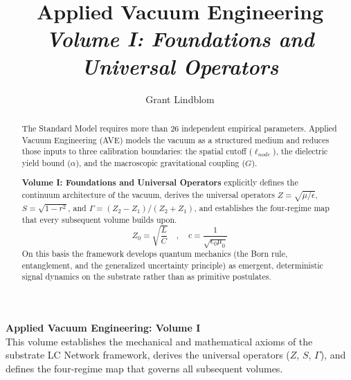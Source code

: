 \title{\textbf{Applied Vacuum Engineering} \\ \large \textit{Volume I: Foundations and Universal Operators}}
\author{Grant Lindblom}
\date{}

\maketitle

\vfill
\noindent\textbf{Applied Vacuum Engineering: Volume I} \\
This volume establishes the mechanical and mathematical axioms of the substrate LC Network framework, derives the universal operators ($Z$, $S$, $\Gamma$), and defines the four-regime map that governs all subsequent volumes.

\begin{abstract}
    The Standard Model requires more than 26 independent empirical parameters. Applied Vacuum Engineering (AVE) models the vacuum as a structured medium and reduces those inputs to three calibration boundaries: the spatial cutoff ($\ell_{node}$), the dielectric yield bound ($\alpha$), and the macroscopic gravitational coupling ($G$).
    
    \textbf{Volume I: Foundations and Universal Operators} explicitly defines the continuum architecture of the vacuum, derives the universal operators $Z = \sqrt{\mu/\epsilon}$, $S = \sqrt{1 - r^2}$, and $\Gamma = (Z_2 - Z_1)/(Z_2 + Z_1)$, and establishes the four-regime map that every subsequent volume builds upon.
    \begin{equation}
        Z_0 = \sqrt{\frac{L}{C}} \quad , \quad c = \frac{1}{\sqrt{\epsilon_0 \mu_0}}
    \end{equation}
    On this basis the framework develops quantum mechanics (the Born rule, entanglement, and the generalized uncertainty principle) as emergent, deterministic signal dynamics on the substrate rather than as primitive postulates.
\end{abstract}

